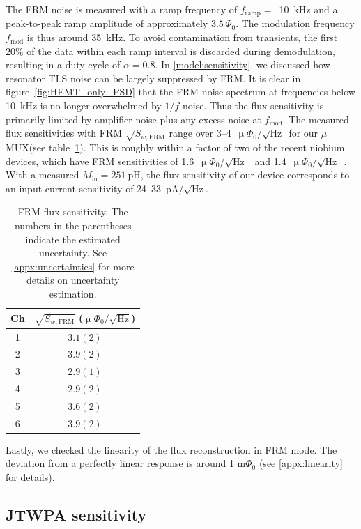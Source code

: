 \documentclass[
 prd,
 reprint,
 superscriptaddress,
 amsmath,amssymb,
 aps,
 floatfix,
]{revtex4-2}
\newcommand{\uMUX}{$\mu$MUX\xspace}
\newcommand{\uPhirtHz}{$\upmu \Phi_0/\sqrt{\text{Hz}}$\xspace}
\begin{document}
The FRM noise is measured with a ramp frequency of $f_{\mathrm{ramp}} = $~\qty{10}{\kHz} and a peak-to-peak ramp amplitude of approximately $3.5\,\Phi_0$. The modulation frequency $f_{\text{mod}}$ is thus around \qty{35}{kHz}. To avoid contamination from transients, the first $20\%$ of the data within each ramp interval is discarded during demodulation, resulting in a duty cycle of \mbox{$\alpha = 0.8$}. In \cref{model:sensitivity}, we discussed how resonator TLS noise can be largely suppressed by FRM. It is clear in figure~\ref{fig:HEMT_only_PSD} that the FRM noise spectrum at frequencies below \qty{10}{\kHz} is no longer overwhelmed by $1/f$ noise. Thus the flux sensitivity is primarily limited by amplifier noise plus any excess noise at $f_{\text{mod}}$. The measured flux sensitivities with FRM $\sqrt{S_{w, \text{FRM}}}$ range over 3--4~\uPhirtHz~for our \uMUX (see table~\ref{tab:FRM_noise}). This is roughly within a factor of two of the recent niobium devices, which have FRM sensitivities of 1.6~\uPhirtHz~\cite{malnou_improved_2023} and 1.4~\uPhirtHz~\cite{neidig_full-scale_2025}. With a measured $M_{\mathrm{in}} = 251~\mathrm{pH}$, the flux sensitivity of our device corresponds to an input current sensitivity of 24--33~$\mathrm{pA}/\sqrt{\mathrm{Hz}}$.

\begin{table}[htb]
    \centering
    \begin{tabular}{c c}
    \hline
         \small{Ch} & \small{$\sqrt{S_{w, \text{FRM}}}$ (\uPhirtHz)}\\
    \hline
    1 & $3.1 (2)$\\
    2 & $3.9 (2)$\\
    3 & $2.9 (1)$\\
    4 & $2.9 (2)$\\
    5 & $3.6 (2)$\\
    6 & $3.9 (2)$\\
    \hline
    \end{tabular}
    \caption{FRM flux sensitivity. The numbers in the parentheses indicate the estimated uncertainty. See \ref{appx:uncertainties} for more details on uncertainty estimation.}
    \label{tab:FRM_noise}
\end{table}

Lastly, we checked the linearity of the flux reconstruction in FRM mode. The deviation from a perfectly linear response is around 1 $\mathrm{m}\Phi_0$ (see \ref{appx:linearity} for details).


\subsection{JTWPA sensitivity}
\label{results:TWPA}
\end{document}
